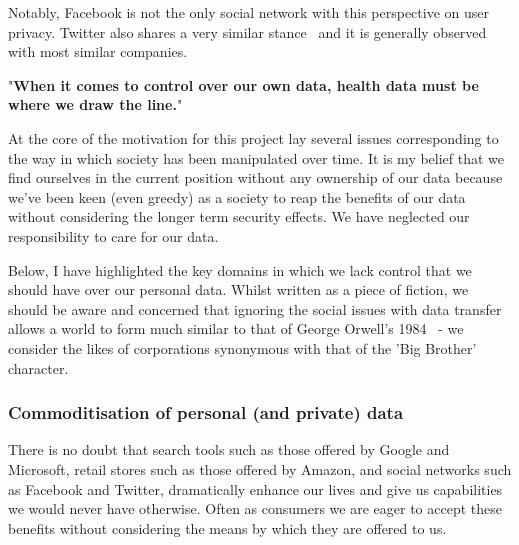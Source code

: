 Notably, Facebook is not the only social network with this perspective on user privacy. Twitter also shares a very similar stance~\cite{twittertos:2017:online} and it is generally observed with most similar companies.

\begin{displayquote}{
  "\textbf{When it comes to control over our own data, health data must be where we draw the line.}"~\cite{wilbankstopol:2016:article}
}\end{displayquote}




At the core of the motivation for this project lay several issues corresponding to the way in which society has been manipulated over time. It is my belief that we find ourselves in the current position without any ownership of our data because we've been keen (even greedy) as a society to reap the benefits of our data without considering the longer term security effects. We have neglected our responsibility to care for our data.

Below, I have highlighted the key domains in which we lack control that we should have over our personal data. Whilst written as a piece of fiction, we should be aware and concerned that ignoring the social issues with data transfer allows a world to form much similar to that of George Orwell's 1984~\cite{orwell:1984:book} - we consider the likes of corporations synonymous with that of the 'Big Brother' character.

\subsubsection{Commoditisation of personal (and private) data}

There is no doubt that search tools such as those offered by Google and Microsoft, retail stores such as those offered by Amazon, and social networks such as Facebook and Twitter, dramatically enhance our lives and give us capabilities we would never have otherwise. Often as consumers we are eager to accept these benefits without considering the means by which they are offered to us.


